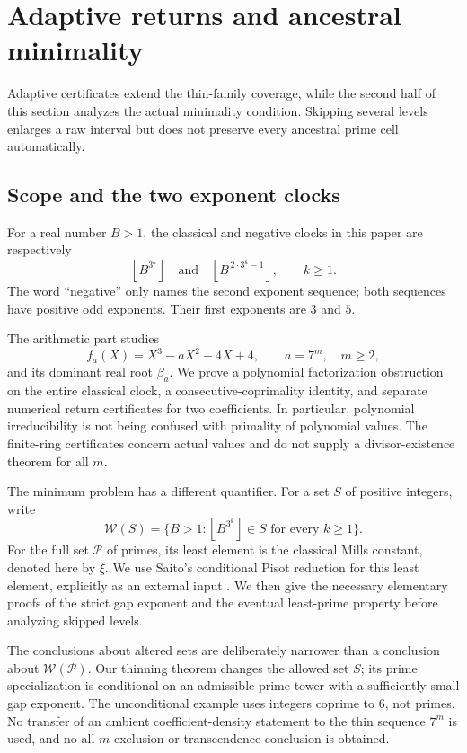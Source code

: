 \documentclass[11pt,a4paper]{article}
\theoremstyle{definition}\newtheorem{definition}[theorem]{Definition}
\theoremstyle{remark}\newtheorem{remark}[theorem]{Remark}
\newcommand{\PP}{\mathbb P}\newcommand{\W}{\mathcal W}\newcommand{\SaitoL}{\mathcal S}
\newcommand{\floor}[1]{\left\lfloor#1\right\rfloor}
\begin{document}
\endgroup

\section{Adaptive returns and ancestral minimality}\label{src:R14}
Adaptive certificates extend the thin-family coverage, while the second half of this section analyzes the actual minimality condition. Skipping several levels enlarges a raw interval but does not preserve every ancestral prime cell automatically.
\medskip
\begingroup
\renewcommand{\PP}{\mathcal P}




\subsection{Scope and the two exponent clocks}

For a real number $B>1$, the classical and negative clocks in this
paper are respectively
\[
 \floor{B^{3^k}}\quad\text{and}\quad
 \floor{B^{\,2\cdot3^k-1}},\qquad k\ge1.
\]
The word ``negative'' only names the second exponent sequence; both
sequences have positive odd exponents. Their first exponents are $3$
and $5$.

The arithmetic part studies
\begin{equation}\label{R14:eq:family}
 f_a(X)=X^3-aX^2-4X+4,\qquad a=7^m,\quad m\ge2,
\end{equation}
and its dominant real root $\beta_a$. We prove a polynomial
factorization obstruction on the entire classical clock, a
consecutive-coprimality identity, and separate numerical return
certificates for two coefficients. In particular, polynomial
irreducibility is not being confused with primality of polynomial
values. The finite-ring certificates concern actual values and do
not supply a divisor-existence theorem for all $m$.

The minimum problem has a different quantifier. For a set $S$ of
positive integers, write
\[
 \mathcal W(S)=
 \{B>1:\floor{B^{3^k}}\in S\text{ for every }k\ge1\}.
\]
For the full set $\PP$ of primes, its least element is the classical
Mills constant, denoted here by $\xi$. We use Saito's conditional
Pisot reduction for this least element, explicitly as an external
input \cite[Theorem 1.7]{Saito}. We then give the necessary elementary
proofs of the strict gap exponent and the eventual least-prime
property before analyzing skipped levels.

The conclusions about altered sets are deliberately narrower than a
conclusion about $\mathcal W(\PP)$. Our thinning theorem changes the
allowed set $S$; its prime specialization is conditional on an
admissible prime tower with a sufficiently small gap exponent. The
unconditional example uses integers coprime to $6$, not primes.
No transfer of an ambient coefficient-density statement to the thin
sequence $7^m$ is used, and no all-$m$ exclusion or transcendence
conclusion is obtained.
\end{document}
